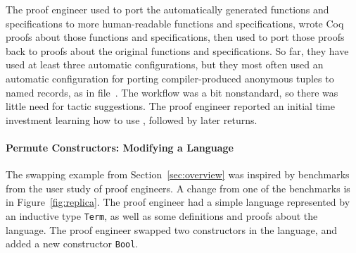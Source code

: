 The proof engineer used \toolnamec to port the automatically generated functions and specifications to more
human-readable functions and specifications, wrote Coq proofs about those functions and specifications, then
used \toolnamec to port those proofs back to
proofs about the original functions and specifications.
So far, they have used at least three automatic configurations,
but they most often used an automatic configuration for porting compiler-produced anonymous tuples
to named records, as in file~\href{https://github.com/Ptival/saw-core-coq/tree/dump-wip}{}. %
The workflow was a bit nonstandard,
so there was little need for tactic suggestions.
The proof engineer reported an initial time investment learning how to use \toolnamec,
followed by later returns.

\begin{figure*}
\begin{minipage}{0.49\textwidth}
   
\end{minipage}
\hfill
\begin{minipage}{0.49\textwidth}
   
\end{minipage}
\caption{A simple language (left) and the same language with two swapped constructors and an added constructor (right).}
\label{fig:replica}
\end{figure*}

\paragraph{Permute Constructors: Modifying a Language}
The swapping example from Section~\ref{sec:overview} was inspired by benchmarks 
from the  user study of proof engineers.
A change from one of the benchmarks is in Figure~\ref{fig:replica}.
The proof engineer had a simple language represented by an inductive type \lstinline{Term},
as well as some definitions and proofs about the language.
The proof engineer swapped two constructors in the language,
and added a new constructor \lstinline{Bool}.

